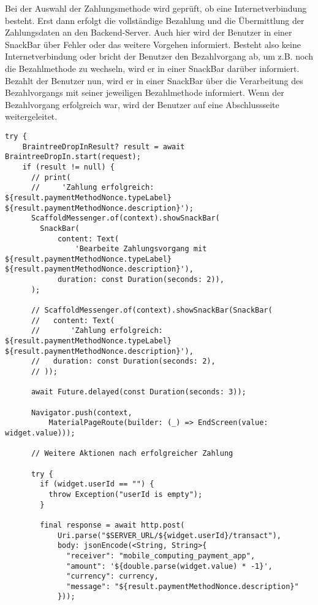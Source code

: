 Bei der Auswahl der Zahlungsmethode wird geprüft, ob eine Internetverbindung besteht.
Erst dann erfolgt die vollständige Bezahlung und die Übermittlung der Zahlungsdaten an den Backend-Server.
Auch hier wird der Benutzer in einer SnackBar über Fehler oder das weitere Vorgehen informiert.
Besteht also keine Internetverbindung oder bricht der Benutzer den Bezahlvorgang ab, um z.B. noch die Bezahlmethode zu wechseln, wird er in einer SnackBar darüber informiert.
Bezahlt der Benutzer nun, wird er in einer SnackBar über die Verarbeitung des Bezahlvorgangs mit seiner jeweiligen Bezahlmethode informiert.
Wenn der Bezahlvorgang erfolgreich war, wird der Benutzer auf eine Abschlussseite weitergeleitet.

\begin{lstlisting}[caption={Durchführung des Bezahlvorganges}]
  try {
    BraintreeDropInResult? result = await BraintreeDropIn.start(request);
    if (result != null) {
      // print(
      //     'Zahlung erfolgreich: ${result.paymentMethodNonce.typeLabel} ${result.paymentMethodNonce.description}');
      ScaffoldMessenger.of(context).showSnackBar(
        SnackBar(
            content: Text(
                'Bearbeite Zahlungsvorgang mit ${result.paymentMethodNonce.typeLabel} ${result.paymentMethodNonce.description}'),
            duration: const Duration(seconds: 2)),
      );

      // ScaffoldMessenger.of(context).showSnackBar(SnackBar(
      //   content: Text(
      //       'Zahlung erfolgreich: ${result.paymentMethodNonce.typeLabel} ${result.paymentMethodNonce.description}'),
      //   duration: const Duration(seconds: 2),
      // ));

      await Future.delayed(const Duration(seconds: 3));

      Navigator.push(context,
          MaterialPageRoute(builder: (_) => EndScreen(value: widget.value)));

      // Weitere Aktionen nach erfolgreicher Zahlung

      try {
        if (widget.userId == "") {
          throw Exception("userId is empty");
        }

        final response = await http.post(
            Uri.parse("$SERVER_URL/${widget.userId}/transact"),
            body: jsonEncode(<String, String>{
              "receiver": "mobile_computing_payment_app",
              "amount": '${double.parse(widget.value) * -1}',
              "currency": currency,
              "message": "${result.paymentMethodNonce.description}"
            }));


\end{lstlisting}
